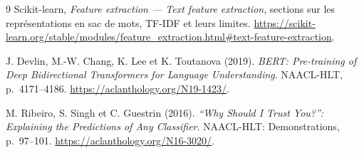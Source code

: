 \documentclass[11pt,a4paper]{article}
\begin{document}
\begin{thebibliography}{9}
Scikit-learn, \emph{Feature extraction --- Text feature extraction},
sections sur les représentations en sac de mots, TF-IDF et leurs limites.
\url{https://scikit-learn.org/stable/modules/feature_extraction.html#text-feature-extraction}.

J. Devlin, M.-W. Chang, K. Lee et K. Toutanova (2019).
\emph{BERT: Pre-training of Deep Bidirectional Transformers for Language Understanding}.
NAACL-HLT, p.~4171--4186.
\url{https://aclanthology.org/N19-1423/}.

M. Ribeiro, S. Singh et C. Guestrin (2016).
\emph{``Why Should I Trust You?'': Explaining the Predictions of Any Classifier}.
NAACL-HLT: Demonstrations, p.~97--101.
\url{https://aclanthology.org/N16-3020/}.
\end{thebibliography}
\end{document}
